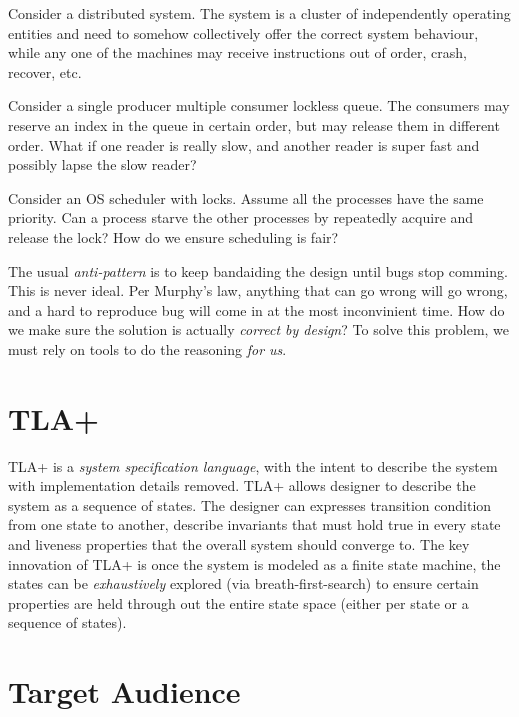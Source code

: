 \documentclass{report}
\begin{document}
Consider a distributed system. The system is a cluster of independently
operating entities and need to somehow collectively offer the correct system
behaviour, while any one of the machines may receive instructions out of order,
crash, recover, etc. \newline

Consider a single producer multiple consumer lockless queue. The consumers may 
reserve an index in the queue in certain order, but may release them in different order. 
What if one reader is really slow, and another reader is super fast and possibly 
lapse the slow reader? \newline

Consider an OS scheduler with locks. Assume all the processes have the same
priority. Can a process starve the other processes by repeatedly acquire and
release the lock? How do we ensure scheduling is fair?\newline

The usual \textit{anti-pattern} is to keep bandaiding the design until bugs stop
comming. This is never ideal. Per Murphy's law, anything that can go wrong will
go wrong, and a hard to reproduce bug will come in at the most inconvinient
time. How do we make sure the solution is actually \textit{correct by design}?
To solve this problem, we must rely on tools to do the reasoning \textit{for
us}.

\section{TLA+}

TLA+ is a \textit{system specification language}, with the intent to describe
the system with implementation details removed. TLA+ allows designer to describe
the system as a sequence of states. The designer can expresses transition
condition from one state to another, describe invariants that must hold true in
every state and liveness properties that the overall system should converge to.
The key innovation of TLA+ is once the system is modeled as a finite state
machine, the states can be \textit{exhaustively} explored (via
breath-first-search) to ensure certain properties are held through out the
entire state space (either per state or a sequence of states).\newline

\section{Target Audience}
\end{document}
